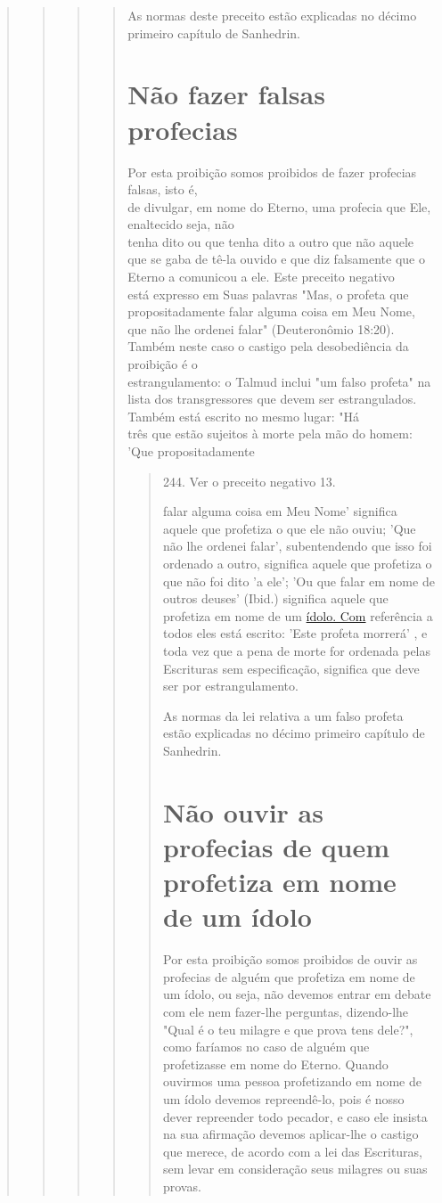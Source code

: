 \begin{quote}
\begin{quote}
\begin{quote}
\begin{quote}
As normas deste preceito estão explicadas no décimo primeiro capí­tulo
de Sanhedrin.

\section{Não fazer falsas profecias}

Por esta proibição somos proibidos de fazer profecias falsas, isto é,\\
de divulgar, em nome do Eterno, uma profecia que Ele, enaltecido seja,
não\\
tenha dito ou que tenha dito a outro que não aquele que se gaba de tê-la
ouvido
e que diz falsamente que o Eterno a comunicou a ele. Este preceito
negativo\\
está expresso em Suas palavras "Mas, o profeta que propositadamente
falar alguma
coisa em Meu Nome, que não lhe ordenei falar" (Deuteronômio
18:20).\\
Também neste caso o castigo pela desobediência da proibição é o\\
estrangulamento: o Talmud inclui "um falso profeta" na lista dos
transgressores
que devem ser estrangulados. Também está escrito no mesmo lugar:
"Há\\
três que estão sujeitos à morte pela mão do homem: 'Que propositadamente

\begin{quote}
244. Ver o preceito negativo 13.

falar alguma coisa em Meu Nome' significa aquele que profetiza o que ele
não ouviu; 'Que não lhe ordenei falar', subentendendo que isso foi
ordenado a ou­tro, significa aquele que profetiza o que não foi dito 'a
ele'; 'Ou que falar em nome de outros deuses' (Ibid.) significa aquele
que profetiza em nome de um \href{http://ídolo.Com}{{ídolo. Com}}
referência a todos eles está escrito: 'Este profeta morrerá' , e toda
vez que a pena de morte for ordenada pelas Escrituras sem especificação,
signi­fica que deve ser por estrangulamento.

As normas da lei relativa a um falso profeta estão explicadas no déci­mo
primeiro capítulo de Sanhedrin.

\section{Não ouvir as profecias de quem profetiza em nome de um ídolo}

Por esta proibição somos proibidos de ouvir as profecias de alguém que
profetiza em nome de um ídolo, ou seja, não devemos entrar em debate com
ele nem fazer-lhe perguntas, dizendo-lhe "Qual é o teu milagre e que
pro­va tens dele?", como faríamos no caso de alguém que profetizasse em
nome do Eterno. Quando ouvirmos uma pessoa profetizando em nome de um
ídolo devemos repreendê-lo, pois é nosso dever repreender todo pecador,
e caso ele insista na sua afirmação devemos aplicar-lhe o castigo que
merece, de acordo com a lei das Escrituras, sem levar em consideração
seus milagres ou suas provas.


\end{quote}
\end{quote}
\end{quote}
\end{quote}
\end{quote}
